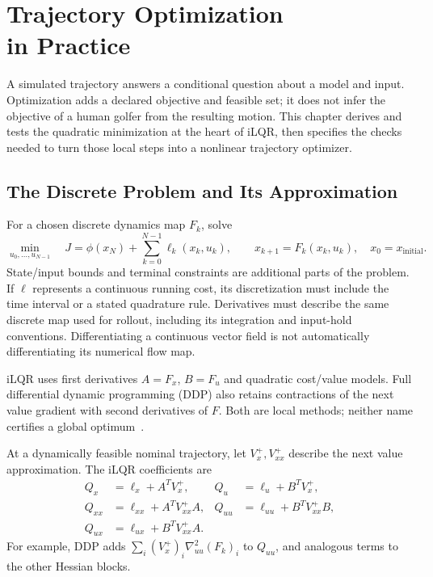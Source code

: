 \chapter[Trajectory Optimization in Practice]{Trajectory Optimization\\in Practice}
\label{ch:traj-opt}

A simulated trajectory answers a conditional question about a model and input.
Optimization adds a declared objective and feasible set; it does not infer the
objective of a human golfer from the resulting motion. This chapter derives and
tests the quadratic minimization at the heart of iLQR, then specifies the checks
needed to turn those local steps into a nonlinear trajectory optimizer.

\section{The Discrete Problem and Its Approximation}

For a chosen discrete dynamics map $F_k$, solve
\[
 \min_{u_0,\ldots,u_{N-1}}\quad
 J=\phi(x_N)+\sum_{k=0}^{N-1}\ell_k(x_k,u_k),\qquad
 x_{k+1}=F_k(x_k,u_k),\quad x_0=x_{\mathrm{initial}}.
\]
State/input bounds and terminal constraints are additional parts of the problem.
If $\ell$ represents a continuous running cost, its discretization must include
the time interval or a stated quadrature rule. Derivatives must describe the
same discrete map used for rollout, including its integration and input-hold
conventions. Differentiating a continuous vector field is not automatically
differentiating its numerical flow map.

iLQR uses first derivatives $A=F_x$, $B=F_u$ and quadratic cost/value models.
Full differential dynamic programming (DDP) also retains contractions of the
next value gradient with second derivatives of $F$. Both are local methods;
neither name certifies a global optimum~\cite{Mayne1966,jacobson1970dpp,TedrakeTrajectoryFoundations}.

At a dynamically feasible nominal trajectory, let $V_x^+,V_{xx}^+$ describe
the next value approximation. The iLQR coefficients are
\begin{align*}
 Q_x&=\ell_x+A^TV_x^+,& Q_u&=\ell_u+B^TV_x^+,\\
 Q_{xx}&=\ell_{xx}+A^TV_{xx}^+A,&
 Q_{uu}&=\ell_{uu}+B^TV_{xx}^+B,\\
 Q_{ux}&=\ell_{ux}+B^TV_{xx}^+A.&
\end{align*}
For example, DDP adds $\sum_i(V_x^+)_i\nabla_{uu}^2(F_k)_i$
to $Q_{uu}$, and analogous terms to the other Hessian blocks.

